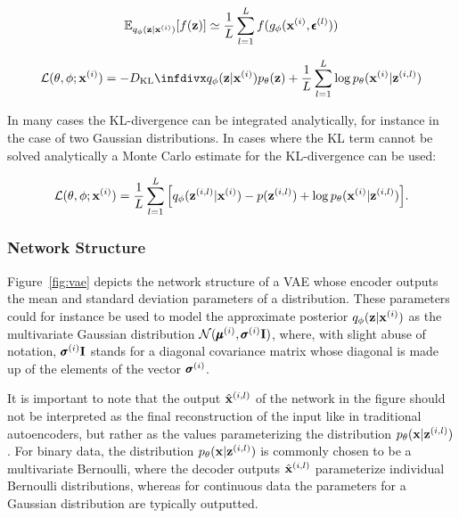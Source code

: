 $$\mathbb{E}_{q_{\phi}(\mathbf{z} \vert \mathbf{x}^{(i)})}[f(\mathbf{z})] \simeq \frac{1}{L} \sum_{l=1}^{L} f(g_{\phi}(\mathbf{x}^{(i)}, \pmb{\epsilon}^{(l)}))$$

\begin{equation}
\mathcal{L}(\btheta, \bphi; \bxi) = -\dkl{\qphi(\bz \vert \bxi)}{\ptheta(\bz)} + \frac{1}{L} \sum_{l=1}^{L} \log \ptheta(\bxi \vert \bz^{(i,l)})
\label{eq:vae_loss}
\end{equation}

In many cases the KL-divergence can be integrated analytically, for instance in the case of two Gaussian distributions. In cases where the KL term cannot be solved analytically a Monte Carlo estimate for the KL-divergence can be used:

\begin{equation}
\mathcal{L}(\theta, \phi; \mathbf{x}^{(i)}) = \frac{1}{L} \sum_{l=1}^{L} \Big[q_{\phi}(\mathbf{z}^{(i,l)} \vert \mathbf{x}^{(i)}) - p(\mathbf{z}^{(i,l)}) + \log p_{\theta}(\mathbf{x}^{(i)} \vert \mathbf{z}^{(i,l)})\Big].
\label{eq:vae_loss_2}
\end{equation}


\subsubsection{Network Structure}

Figure~\ref{fig:vae} depicts the network structure of a VAE whose encoder outputs the mean and standard deviation parameters of a distribution. These parameters could for instance be used to model the approximate posterior $q_{\phi}(\mathbf{z} \vert \mathbf{x}^{(i)})$ as the multivariate Gaussian distribution $\mathcal{N}(\pmb{\mu}^{(i)}, \pmb{\sigma}^{(i)} \mathbf{I})$, where, with slight abuse of notation, $\pmb{\sigma}^{(i)} \mathbf{I}$ stands for a diagonal covariance matrix whose diagonal is made up of the elements of the vector $\pmb{\sigma}^{(i)}$.

It is important to note that the output $\hat{\mathbf{x}}^{(i,l)}$ of the network in the figure should not be interpreted as the final reconstruction of the input like in traditional autoencoders, but rather as the values parameterizing the distribution $p_{\theta}(\mathbf{x} \vert \mathbf{z}^{(i, l)})$. For binary data, the distribution $p_{\theta}(\mathbf{x} \vert \mathbf{z}^{(i, l)})$ is commonly chosen to be a multivariate Bernoulli, where the decoder outputs $\hat{\mathbf{x}}^{(i,l)}$ parameterize individual Bernoulli distributions, whereas for continuous data the parameters for a Gaussian distribution are typically outputted.

